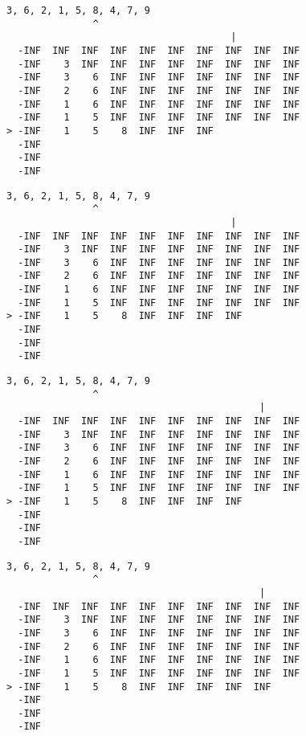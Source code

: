 { \begin{verbatim}
3, 6, 2, 1, 5, 8, 4, 7, 9
               ^
                                       |
  -INF  INF  INF  INF  INF  INF  INF  INF  INF  INF
  -INF    3  INF  INF  INF  INF  INF  INF  INF  INF
  -INF    3    6  INF  INF  INF  INF  INF  INF  INF
  -INF    2    6  INF  INF  INF  INF  INF  INF  INF
  -INF    1    6  INF  INF  INF  INF  INF  INF  INF
  -INF    1    5  INF  INF  INF  INF  INF  INF  INF
> -INF    1    5    8  INF  INF  INF               
  -INF                                             
  -INF                                             
  -INF                                             
\end{verbatim} }

{ \begin{verbatim}
3, 6, 2, 1, 5, 8, 4, 7, 9
               ^
                                       |
  -INF  INF  INF  INF  INF  INF  INF  INF  INF  INF
  -INF    3  INF  INF  INF  INF  INF  INF  INF  INF
  -INF    3    6  INF  INF  INF  INF  INF  INF  INF
  -INF    2    6  INF  INF  INF  INF  INF  INF  INF
  -INF    1    6  INF  INF  INF  INF  INF  INF  INF
  -INF    1    5  INF  INF  INF  INF  INF  INF  INF
> -INF    1    5    8  INF  INF  INF  INF          
  -INF                                             
  -INF                                             
  -INF                                             
\end{verbatim} }

{ \begin{verbatim}
3, 6, 2, 1, 5, 8, 4, 7, 9
               ^
                                            |
  -INF  INF  INF  INF  INF  INF  INF  INF  INF  INF
  -INF    3  INF  INF  INF  INF  INF  INF  INF  INF
  -INF    3    6  INF  INF  INF  INF  INF  INF  INF
  -INF    2    6  INF  INF  INF  INF  INF  INF  INF
  -INF    1    6  INF  INF  INF  INF  INF  INF  INF
  -INF    1    5  INF  INF  INF  INF  INF  INF  INF
> -INF    1    5    8  INF  INF  INF  INF          
  -INF                                             
  -INF                                             
  -INF                                             
\end{verbatim} }

{ \begin{verbatim}
3, 6, 2, 1, 5, 8, 4, 7, 9
               ^
                                            |
  -INF  INF  INF  INF  INF  INF  INF  INF  INF  INF
  -INF    3  INF  INF  INF  INF  INF  INF  INF  INF
  -INF    3    6  INF  INF  INF  INF  INF  INF  INF
  -INF    2    6  INF  INF  INF  INF  INF  INF  INF
  -INF    1    6  INF  INF  INF  INF  INF  INF  INF
  -INF    1    5  INF  INF  INF  INF  INF  INF  INF
> -INF    1    5    8  INF  INF  INF  INF  INF     
  -INF                                             
  -INF                                             
  -INF                                             
\end{verbatim} }

